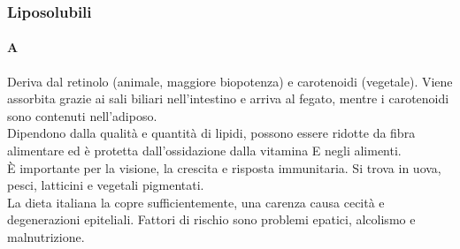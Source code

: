 \documentclass[10pt]{article}
\begin{document}
\subsubsection{Liposolubili}
\paragraph*{A} Deriva dal retinolo (animale, maggiore biopotenza) e carotenoidi (vegetale). Viene assorbita grazie ai sali biliari nell'intestino e arriva al fegato, mentre i carotenoidi sono contenuti nell'adiposo.\\
Dipendono dalla qualità e quantità di lipidi, possono essere ridotte da fibra alimentare ed è protetta dall'ossidazione dalla vitamina E negli alimenti. \\
È importante per la visione, la crescita e risposta immunitaria. Si trova in uova, pesci, latticini e vegetali pigmentati.\\
La dieta italiana la copre sufficientemente, una carenza causa cecità e degenerazioni epiteliali. Fattori di rischio sono problemi epatici, alcolismo e malnutrizione.
\end{document}
